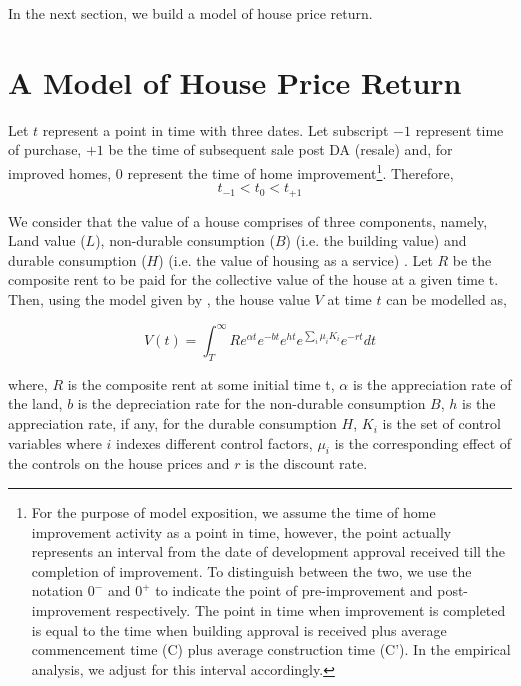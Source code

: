 \documentclass[AEJ,reqno, draftmode]{AEA} %
\begin{document}
In the next section, we build a model of house price return.

\section{A Model of House Price Return}

Let $t$ represent a point in time with three dates. Let subscript $-1$ represent time of purchase, $+1$ be the time of subsequent sale post DA (resale) and, for improved homes, $0$ represent the time of home improvement\footnote{For the purpose of model exposition, we assume the time of home improvement activity as a point in time, however, the point actually represents an interval from the date of development approval received till the completion of improvement. To distinguish between the two, we use the notation $0^-$ and $0^+$ to indicate the point of pre-improvement and post-improvement respectively. The point in time when improvement is completed is equal to the time when building approval is received plus average commencement time (C) plus average construction time (C'). In the empirical analysis, we adjust for this interval accordingly.}. Therefore, $$t_{-1} < t_0 < t_{+1}$$ %

We consider that the value of a house comprises of three components, namely, Land value ($L$), non-durable consumption ($B$) (i.e. the building value) and durable consumption ($H$) (i.e. the value of housing as a service) \citep{flavin2008model}. Let $R$ be the composite rent to be paid for the collective value of the house at a given time t. Then, using the model given by \citet{kiel1995effect}, the house value $V$ at time $t$ can be modelled as,

\begin{equation}
    V(t) = \int_{T}^{\infty} R e^{\alpha t} e^{-bt} e^{ht} e^{\sum_{i} \mu_i K_i} e^{-rt} dt
\end{equation}

where, $R$ is the composite rent at some initial time t, $\alpha$ is the appreciation rate of the land, $b$ is the depreciation rate for the non-durable consumption $B$, $h$ is the appreciation rate, if any, for the durable consumption $H$, $K_i$ is the set of control variables where $i$ indexes different control factors, $\mu_i$ is the corresponding effect of the controls on the house prices and $r$ is the discount rate. 
\end{document}
